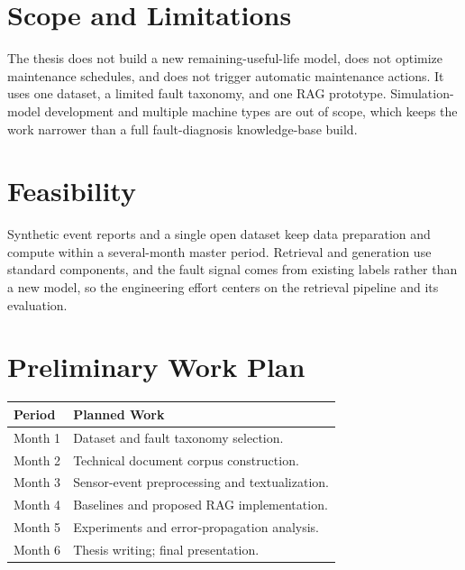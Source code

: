 \documentclass[10pt,a4paper]{article}
\begin{document}
\section{Scope and Limitations}

The thesis does not build a new remaining-useful-life model, does not optimize maintenance schedules, and does not trigger automatic maintenance actions. It uses one dataset, a limited fault taxonomy, and one RAG prototype. Simulation-model development and multiple machine types are out of scope, which keeps the work narrower than a full fault-diagnosis knowledge-base build.

\section{Feasibility}

Synthetic event reports and a single open dataset keep data preparation and compute within a several-month master period. Retrieval and generation use standard components, and the fault signal comes from existing labels rather than a new model, so the engineering effort centers on the retrieval pipeline and its evaluation.

\section{Preliminary Work Plan}

\begin{tabularx}{\textwidth}{|p{1.9cm}|X|}
\hline
\rowcolor{lightgray}
\textbf{Period} & \textbf{Planned Work} \\
\hline
Month 1 & Dataset and fault taxonomy selection. \\
\hline
Month 2 & Technical document corpus construction. \\
\hline
Month 3 & Sensor-event preprocessing and textualization. \\
\hline
Month 4 & Baselines and proposed RAG implementation. \\
\hline
Month 5 & Experiments and error-propagation analysis. \\
\hline
Month 6 & Thesis writing; final presentation. \\
\hline
\end{tabularx}
\end{document}
